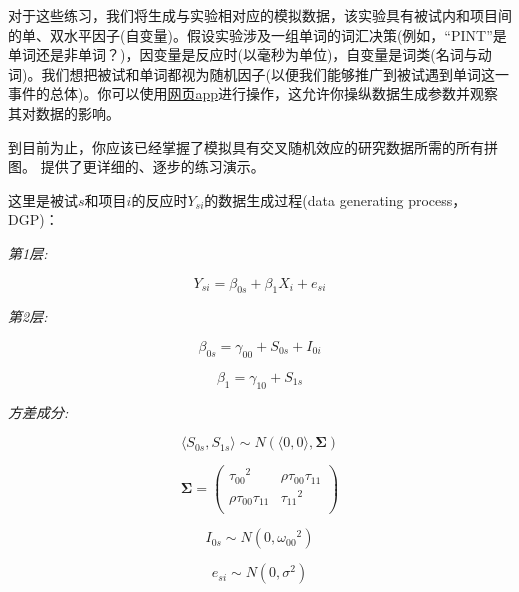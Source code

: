 \documentclass[
]{book}
\begin{document}
对于这些练习，我们将生成与实验相对应的模拟数据，该实验具有被试内和项目间的单、双水平因子(自变量)。假设实验涉及一组单词的词汇决策(例如，``PINT''是单词还是非单词？)，因变量是反应时(以毫秒为单位)，自变量是词类(名词与动词)。我们想把被试和单词都视为随机因子(以便我们能够推广到被试遇到单词这一事件的总体)。你可以使用\href{https://rstudio-connect.psy.gla.ac.uk/crossed}{网页app}进行操作，这允许你操纵数据生成参数并观察其对数据的影响。

到目前为止，你应该已经掌握了模拟具有交叉随机效应的研究数据所需的所有拼图。\citet{Debruine_Barr_2020} 提供了更详细的、逐步的练习演示。

这里是被试\(s\)和项目\(i\)的反应时\(Y_{si}\)的数据生成过程(data generating process，DGP)：

\emph{第1层:}

\begin{equation}
Y_{si} = \beta_{0s} + \beta_{1} X_{i} + e_{si}
\end{equation}

\emph{第2层:}

\begin{equation}
\beta_{0s} = \gamma_{00} + S_{0s} + I_{0i}
\end{equation}

\begin{equation}
\beta_{1} = \gamma_{10} + S_{1s}
\end{equation}

\emph{方差成分:}

\begin{equation}
\langle S_{0s}, S_{1s} \rangle \sim N\left(\langle 0, 0 \rangle, \mathbf{\Sigma}\right) 
\end{equation}

\begin{equation}
\mathbf{\Sigma} = \left(\begin{array}{cc}{\tau_{00}}^2 & \rho\tau_{00}\tau_{11} \\
         \rho\tau_{00}\tau_{11} & {\tau_{11}}^2 \\
         \end{array}\right) 
\end{equation}

\begin{equation}
I_{0s} \sim N\left(0, {\omega_{00}}^2\right) 
\end{equation}

\begin{equation}
e_{si} \sim N\left(0, \sigma^2\right)
\end{equation}
\end{document}
